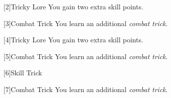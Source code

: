        [2]{Tricky Lore} You gain two extra skill points.

        [3]{Combat Trick}
        You learn an additional \textit{combat trick}.

        [4]{Tricky Lore} You gain two extra skill points.

        [5]{Combat Trick}
        You learn an additional \textit{combat trick}.

        [6]{Skill Trick} %

        [7]{Combat Trick}
        You learn an additional \textit{combat trick}.







